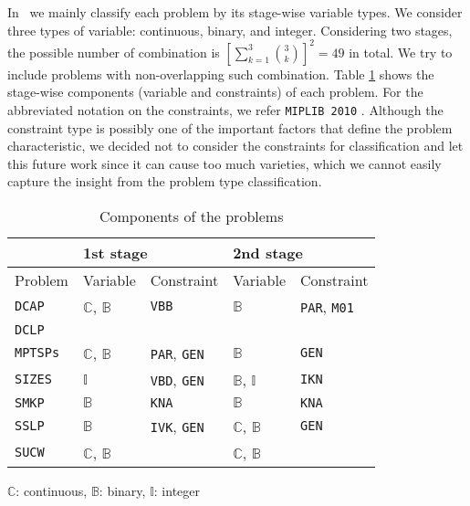 In \siplibtwo\, we mainly classify each problem by its stage-wise variable types. We consider three types of variable: continuous, binary, and integer. Considering two stages, the possible number of combination is $\left[\sum_{k=1}^3\binom{3}{k}\right]^2=49$ in total. We try to include problems with non-overlapping such combination. Table \ref{table:prob_class} shows the stage-wise components (variable and constraints) of each problem. For the abbreviated notation on the constraints, we refer \texttt{MIPLIB 2010} \cite{MIPLIB}. Although the constraint type is possibly one of the important factors that define the problem characteristic, we decided not to consider the constraints for classification and let this future work since it can cause too much varieties, which we cannot easily capture the insight from the problem type classification. 
\begin{table}[H]
	\centering
	\caption{Components of the problems}
	\label{table:prob_class}
	\begin{threeparttable}
		\begin{tabular}{@{}lllll@{}}
			\toprule
			& \multicolumn{2}{l}{1st stage}                              				  	& \multicolumn{2}{l}{2nd stage}                             			        \\ \midrule
			Problem 	     & Variable                    & Constraint                   	& Variable                    & Constraint                  				    \\ \midrule
			\texttt{DCAP}    & $\mathbb{C}$, $\mathbb{B}$  & \texttt{VBB}                	& $\mathbb{B}$                & \texttt{PAR}, \texttt{M01} 			    		\\
			\texttt{DCLP}	 &							   &								& 			 	  &													\\				
			\texttt{MPTSPs}  & $\mathbb{C}$, $\mathbb{B}$  & \texttt{PAR}, \texttt{GEN}		& $\mathbb{B}$                & \texttt{GEN}               						\\
			\texttt{SIZES}   & $\mathbb{I}$ 			   & \texttt{VBD}, \texttt{GEN} 	& $\mathbb{B}$, $\mathbb{I}$  & \texttt{IKN}             						\\
			\texttt{SMKP}    & $\mathbb{B}$                & \texttt{KNA}                	& $\mathbb{B}$                & \texttt{KNA}              						\\
			\texttt{SSLP}    & $\mathbb{B}$                & \texttt{IVK}, \texttt{GEN} 	& $\mathbb{C}$, $\mathbb{B}$  & \texttt{GEN}             						\\
			\texttt{SUCW}    & $\mathbb{C}$, $\mathbb{B}$                 &                              	& $\mathbb{C}$, $\mathbb{B}$  &                             					\\ \bottomrule
		\end{tabular}
		
		\begin{tablenotes}
			\small
			\item $\mathbb{C}$: continuous, $\mathbb{B}$: binary, $\mathbb{I}$: integer
		\end{tablenotes}
	\end{threeparttable}
\end{table}


